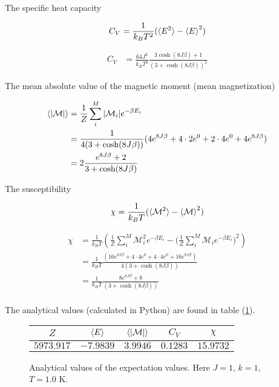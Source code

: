 \documentclass[11pt]{article}
\begin{document}
\begin{flushleft}
The specific heat capacity 

\begin{equation}
C_V = \frac{1}{k_B T^2} (\braket{E^2} - \braket{E}^2)
\end{equation}

\begin{align*}
C_V &= \frac{64J^2}{k_B T^2}
\frac{3\cosh (8J \beta) + 1}{ (3 + \cosh (8 J \beta))^2}
\end{align*}


The mean absolute value of the magnetic moment (mean magnetization)

\begin{align*}
\braket{|\mathcal{M}|} 
&= \frac{1}{Z} \sum_i^M |\mathcal{M}_i| e^{- \beta E_i}\\
&= \frac{1}{4(3 + \cosh (8 J \beta))} (4e^{8J \beta} + 4 \cdot 2 e^0 + 2 \cdot 4 e^0 +4 e^{8 J \beta})\\
& =2 \frac{e^{8J \beta} + 2 }{3 + \cosh (8 J \beta)} \\
\end{align*}



The susceptibility

\begin{equation}
\chi = \frac{1}{k_B T} (\braket{\mathcal{M}^2} - \braket{\mathcal{M}}^2)
\end{equation}

\begin{align*}
\chi &= \frac{1}{k_B T} (\frac{1}{Z} \sum_i^M \mathcal{M}_i^2 e^{- \beta E_i}- \Big(\frac{1}{Z} \sum_i^M \mathcal{M}_i e^{- \beta E_i}\Big)^2)\\
&= \frac{1}{k_B T} 
\frac{(16e^{8J \beta} + 4 \cdot 4 e^0 + 4 \cdot 4 e^0 + 16 e^{8J \beta})}{4(3 + \cosh (8 J \beta))} \\
&= \frac{1}{k_B T} 
\frac{8e^{8J \beta} +8}{(3 + \cosh (8 J \beta))} \\
\end{align*}

\end{flushleft}

\begin{flushleft}
The analytical values (calculated in Python) are found in table (\ref{fig:: analytical}).

\begin{figure}[h]
\label{fig:: analytical}
\centering
\begin{tabular}{|c|c|c|c|c|}
\hline
$Z$ &$\braket{E}$ & $\braket{|\mathcal{M}|}$ & $C_V$ & $\chi$\\
\hline
$5973.917$ & $-7.9839$ & $3.9946$ & $0.1283$ & $15.9732$\\
\hline
\end{tabular}
\caption{Analytical values of the expectation values. Here $J=1$, $k=1$, $T=1.0$ K.}
\end{figure}
\end{flushleft}
\end{document}
